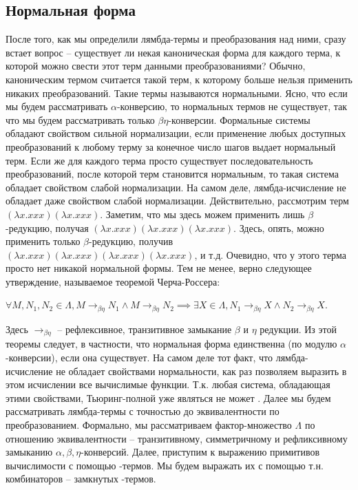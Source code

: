 \subsection{Нормальная форма}
После того, как мы определили лямбда-термы и преобразования над ними, сразу встает вопрос -- существует ли некая каноническая форма
для каждого терма, к которой можно свести этот терм данными преобразованиями? Обычно, каноническим термом считается такой терм,
к которому больше нельзя применить никаких преобразований. Такие термы называются нормальными. Ясно, что если мы будем
рассматривать $\alpha$-конверсию, то нормальных термов не существует, так что мы будем рассматривать только $\beta \eta$-конверсии.
Формальные системы обладают свойством
сильной нормализации, если применение любых доступных преобразований к любому терму за конечное число шагов выдает нормальный терм.
Если же для каждого терма просто существует последовательность преобразований, после которой терм становится нормальным, то такая
система обладает свойством слабой нормализации. На самом деле, лямбда-исчисление не обладает даже свойством слабой нормализации.
Действительно, рассмотрим терм $(\lambda x . xxx)(\lambda x . xxx)$. Заметим, что мы здесь можем применить лишь $\beta$-редукцию,
получая $(\lambda x . xxx)(\lambda x . xxx)(\lambda x . xxx)$. Здесь, опять, можно применить только $\beta$-редукцию, получив
$(\lambda x . xxx)(\lambda x . xxx)(\lambda x . xxx)(\lambda x . xxx)$, и т.д. Очевидно, что у этого терма просто
нет никакой нормальной формы. Тем не менее, верно следующее утверждение, называемое теоремой Черча-Россера:
\begin{theorem}
  $\forall M, N_1, N_2 \in \Lambda, M \rightarrow_{\beta \eta} N_1 \land M \rightarrow_{\beta \eta} N_2 \implies
    \exists X \in \Lambda, N_1 \rightarrow_{\beta \eta} X \land N_2 \rightarrow_{\beta \eta} X$.
\end{theorem}
Здесь $\rightarrow_{\beta \eta}$ -- рефлексивное, транзитивное замыкание $\beta$ и $\eta$ редукции.
Из этой теоремы следует, в частности, что нормальная форма единственна (по модулю $\alpha$-конверсии), если она существует.
На самом деле тот факт, что лямбда-исчисление не обладает свойствами нормальности, как раз позволяем выразить в этом исчислении
все вычислимые функции. Т.к. любая система, обладающая этими свойствами, Тьюринг-полной уже являться не может \cite{Church03}.
Далее мы будем рассматривать лямбда-термы с точностью до эквивалентности по преобразованием. Формально, мы рассматриваем фактор-множество
$\Lambda$ по отношению эквивалентности -- транзитивному, симметричному и рефликсивному замыканию $\alpha, \beta, \eta$-конверсий.
Далее, приступим к выражению примитивов вычислимости с помощью \textlambda-термов. Мы будем выражать их с помощью т.н.
комбинаторов -- замкнутых \textlambda-термов.

